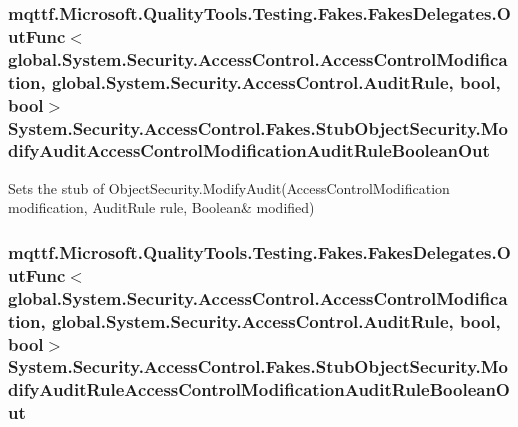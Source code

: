 \hypertarget{class_system_1_1_security_1_1_access_control_1_1_fakes_1_1_stub_object_security_ad9b67f61a7a565e74eb62dd19bfe96af}{
\subsubsection[{Modify\-Audit\-Access\-Control\-Modification\-Audit\-Rule\-Boolean\-Out}]{\setlength{\rightskip}{0pt plus 5cm}mqttf.\-Microsoft.\-Quality\-Tools.\-Testing.\-Fakes.\-Fakes\-Delegates.\-Out\-Func$<$global.\-System.\-Security.\-Access\-Control.\-Access\-Control\-Modification, global.\-System.\-Security.\-Access\-Control.\-Audit\-Rule, bool, bool$>$ System.\-Security.\-Access\-Control.\-Fakes.\-Stub\-Object\-Security.\-Modify\-Audit\-Access\-Control\-Modification\-Audit\-Rule\-Boolean\-Out}}\label{class_system_1_1_security_1_1_access_control_1_1_fakes_1_1_stub_object_security_ad9b67f61a7a565e74eb62dd19bfe96af}


Sets the stub of Object\-Security.\-Modify\-Audit(Access\-Control\-Modification modification, Audit\-Rule rule, Boolean\& modified)

\hypertarget{class_system_1_1_security_1_1_access_control_1_1_fakes_1_1_stub_object_security_a906a1056f24faec454585a18b4f6c80b}{
\subsubsection[{Modify\-Audit\-Rule\-Access\-Control\-Modification\-Audit\-Rule\-Boolean\-Out}]{\setlength{\rightskip}{0pt plus 5cm}mqttf.\-Microsoft.\-Quality\-Tools.\-Testing.\-Fakes.\-Fakes\-Delegates.\-Out\-Func$<$global.\-System.\-Security.\-Access\-Control.\-Access\-Control\-Modification, global.\-System.\-Security.\-Access\-Control.\-Audit\-Rule, bool, bool$>$ System.\-Security.\-Access\-Control.\-Fakes.\-Stub\-Object\-Security.\-Modify\-Audit\-Rule\-Access\-Control\-Modification\-Audit\-Rule\-Boolean\-Out}}\label{class_system_1_1_security_1_1_access_control_1_1_fakes_1_1_stub_object_security_a906a1056f24faec454585a18b4f6c80b}



